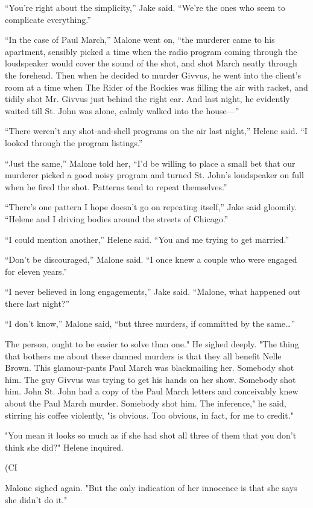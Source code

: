 \documentclass{novel}
\begin{document}
“You’re right about the simplicity,” Jake said. “We’re the ones who seem to complicate everything.”

“In the case of Paul March,” Malone went on, “the murderer came to his apartment, sensibly picked a time when the radio program coming through the loudspeaker would cover the sound of the shot, and shot March neatly through the forehead. Then when he decided to murder Givvus, he went into the client’s room at a time when The Rider of the Rockies was filling the air with racket, and tidily shot Mr. Givvus just behind the right ear. And last night, he evidently waited till St. John was alone, calmly walked into the house—”

“There weren’t any shot-and-shell programs on the air last night,” Helene said. “I looked through the program listings.”

“Just the same,” Malone told her, “I'd be willing to place a small bet that our murderer picked a good noisy program and turned St. John’s loudspeaker on full when he fired the shot. Patterns tend to repeat themselves.”

“There’s one pattern I hope doesn’t go on repeating itself,” Jake said gloomily. “Helene and I driving bodies around the streets of Chicago.”

“I could mention another,” Helene said. “You and me trying to get married.”

“Don’t be discouraged,” Malone said. “I once knew a couple who were engaged for eleven years.”

“I never believed in long engagements,” Jake said. “Malone, what happened out there last night?”

“I don’t know,” Malone said, “but three murders, if committed by the same…”

The person, ought to be easier to solve than one." He sighed deeply. "The thing that bothers me about these damned murders is that they all benefit Nelle Brown. This glamour-pants Paul March was blackmailing her. Somebody shot him. The guy Givvus was trying to get his hands on her show. Somebody shot him. John St. John had a copy of the Paul March letters and conceivably knew about the Paul March murder. Somebody shot him. The inference," he said, stirring his coffee violently, "is obvious. Too obvious, in fact, for me to credit."

"You mean it looks so much as if she had shot all three of them that you don't think she did?" Helene inquired.

(CI

Malone sighed again. "But the only indication of her innocence is that she says she didn't do it."
\end{document}
